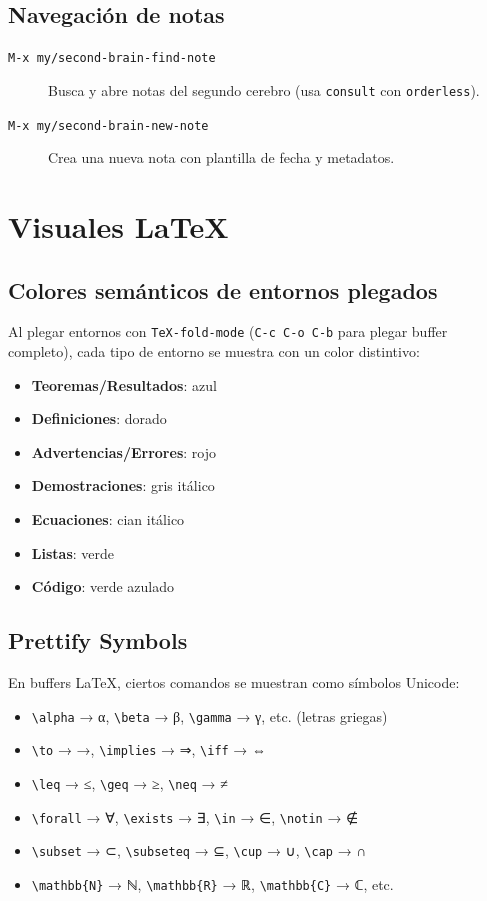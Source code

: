 \documentclass[11pt]{article}
\begin{document}
\subsection{Navegación de notas}
\label{sec:org4eea129}
\begin{description}
\item[{\texttt{M-x my/second-brain-find-note}}] Busca y abre notas del segundo cerebro (usa \texttt{consult} con \texttt{orderless}).
\item[{\texttt{M-x my/second-brain-new-note}}] Crea una nueva nota con plantilla de fecha y metadatos.
\end{description}
\section{Visuales \LaTeX{}}
\label{sec:org0693717}

\subsection{Colores semánticos de entornos plegados}
\label{sec:org9bc3e84}
Al plegar entornos con \texttt{TeX-fold-mode} (\texttt{C-c C-o C-b} para plegar buffer completo), cada tipo de entorno se muestra con un color distintivo:
\begin{itemize}
\item \textbf{Teoremas/Resultados}: azul
\item \textbf{Definiciones}: dorado
\item \textbf{Advertencias/Errores}: rojo
\item \textbf{Demostraciones}: gris itálico
\item \textbf{Ecuaciones}: cian itálico
\item \textbf{Listas}: verde
\item \textbf{Código}: verde azulado
\end{itemize}
\subsection{Prettify Symbols}
\label{sec:org59eb6b1}
En buffers \LaTeX{}, ciertos comandos se muestran como símbolos Unicode:
\begin{itemize}
\item \texttt{\textbackslash{}alpha} → α, \texttt{\textbackslash{}beta} → β, \texttt{\textbackslash{}gamma} → γ, etc. (letras griegas)
\item \texttt{\textbackslash{}to} → →, \texttt{\textbackslash{}implies} → ⇒, \texttt{\textbackslash{}iff} → ⇔
\item \texttt{\textbackslash{}leq} → ≤, \texttt{\textbackslash{}geq} → ≥, \texttt{\textbackslash{}neq} → ≠
\item \texttt{\textbackslash{}forall} → ∀, \texttt{\textbackslash{}exists} → ∃, \texttt{\textbackslash{}in} → ∈, \texttt{\textbackslash{}notin} → ∉
\item \texttt{\textbackslash{}subset} → ⊂, \texttt{\textbackslash{}subseteq} → ⊆, \texttt{\textbackslash{}cup} → ∪, \texttt{\textbackslash{}cap} → ∩
\item \texttt{\textbackslash{}mathbb\{N\}} → ℕ, \texttt{\textbackslash{}mathbb\{R\}} → ℝ, \texttt{\textbackslash{}mathbb\{C\}} → ℂ, etc.
\end{itemize}
\end{document}
